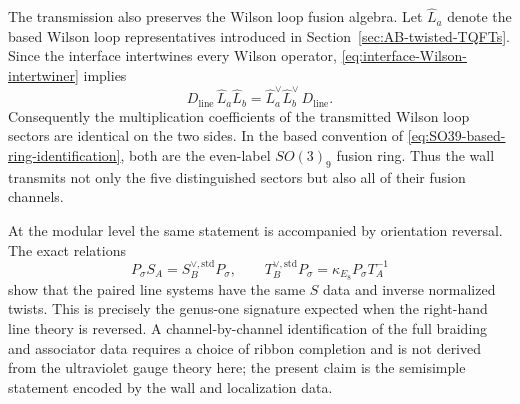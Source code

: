 \documentclass[11pt,a4paper]{article}
\numberwithin{equation}{section}
\begin{document}
The transmission also preserves the Wilson loop fusion algebra.  Let $\widehat L_a$ denote the based Wilson loop representatives introduced in Section~\ref{sec:AB-twisted-TQFTs}.  Since the interface intertwines every Wilson operator, \eqref{eq:interface-Wilson-intertwiner} implies
\begin{equation}
  D_{\mathrm{line}}\,
  \widehat L_a\widehat L_b
  =
  \widehat L_a^\vee\widehat L_b^\vee\,
  D_{\mathrm{line}}.
  \label{eq:folded-fusion-intertwining}
\end{equation}
Consequently the multiplication coefficients of the transmitted Wilson loop sectors are identical on the two sides.  In the based convention of \eqref{eq:SO39-based-ring-identification}, both are the even-label $SO(3)_9$ fusion ring.  Thus the wall transmits not only the five distinguished sectors but also all of their fusion channels.

At the modular level the same statement is accompanied by orientation reversal.  The exact relations
\begin{equation}
  P_\sigma S_A
  =S_B^{\vee,\mathrm{std}}P_\sigma,
  \qquad
  T_B^{\vee,\mathrm{std}}P_\sigma
  =\kappa_{E_8}P_\sigma T_A^{-1}
  \label{eq:folded-modular-intertwining-recalled}
\end{equation}
show that the paired line systems have the same $S$ data and inverse normalized twists.  This is precisely the genus-one signature expected when the right-hand line theory is reversed.  A channel-by-channel identification of the full braiding and associator data requires a choice of ribbon completion and is not derived from the ultraviolet gauge theory here; the present claim is the semisimple statement encoded by the wall and localization data.
\end{document}
